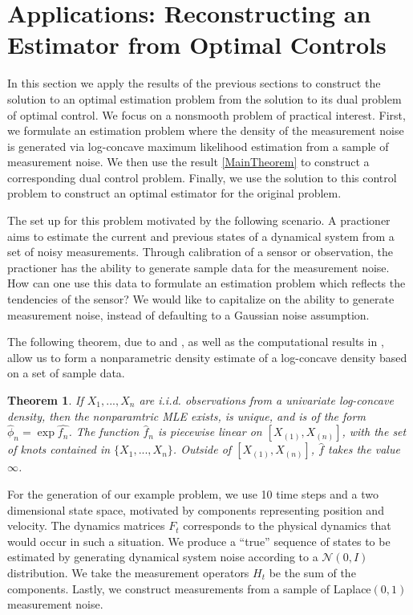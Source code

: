 \documentclass[12pt]{article}
\newtheorem{theorem}{Theorem}[section]
\theoremstyle{remark}
\theoremstyle{remark}
\begin{document}
\section{Applications: Reconstructing an Estimator from Optimal Controls}
In this section we apply the results of the previous sections to
construct the solution to an optimal estimation problem from the solution to its dual problem of
optimal control. We focus on a nonsmooth problem of practical
interest. First, we formulate an
estimation problem where the density of the measurement noise is generated via
log-concave maximum likelihood estimation from a sample of measurement noise. We
then use the result \ref{MainTheorem} to construct a corresponding
dual control problem. Finally, we use the solution to this control problem
to construct an optimal estimator for the original problem.

The set up for this problem motivated by the following scenario. A
practioner aims to estimate the current and previous states of a
dynamical system from a set of
noisy measurements. Through calibration of a sensor or observation, the practioner
has the ability to generate sample data for the measurement noise. How
can one use this data to formulate an estimation problem which reflects
the tendencies of the sensor? We would like to capitalize on the
ability to generate measurement noise, instead of defaulting to a
Gaussian noise assumption.

The following theorem, due to \cite{rufibach} and \cite{pal}, as well as the
computational results in \cite{CRANPackage}, allow us to form a
nonparametric density estimate of a log-concave density based on a set
of sample data.
\begin{theorem}
If $X_1,...,X_n$ are i.i.d. observations from a univariate log-concave
density, then the nonparamtric MLE exists, is unique, and is of the
form $\hat{\phi}_{n} = \exp \hat{f_{n}}$. The function $\hat{f}_{n}$
is
piecewise linear on $[X_{(1)}, X_{(n)}]$, with the set of knots
contained in $\{ X_{1},...,X_{n} \}$. Outside of $[X_{(1)}, X_{(n)}]$,
$\hat{f}$ takes the value $\infty$.
\end{theorem}

For the generation of our example problem, we use 10 time steps
and a two dimensional state space, motivated by components representing position and
velocity. The dynamics matrices $F_{t}$ corresponds to the physical
dynamics that would occur in such a situation. We produce a ``true''
sequence of states to be estimated by generating dynamical system
noise according to a $\mathcal{N}(0,I)$ distribution.
We take the measurement operators $H_{t}$ be the sum of the components.
Lastly, we construct measurements from a sample of
Laplace$(0,1)$ measurement noise.  
\end{document}

